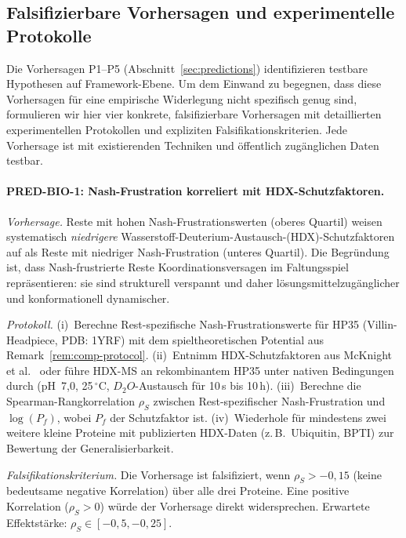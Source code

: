 \documentclass[12pt,a4paper]{article}
\theoremstyle{remark}
\begin{document}
\subsection{Falsifizierbare Vorhersagen und experimentelle Protokolle}
\label{sec:falsifiable-predictions}

Die Vorhersagen P1--P5 (Abschnitt~\ref{sec:predictions}) identifizieren testbare Hypothesen auf Framework-Ebene. Um dem Einwand zu begegnen, dass diese Vorhersagen f\"ur eine empirische Widerlegung nicht spezifisch genug sind, formulieren wir hier vier konkrete, falsifizierbare Vorhersagen mit detaillierten experimentellen Protokollen und expliziten Falsifikationskriterien. Jede Vorhersage ist mit existierenden Techniken und \"offentlich zug\"anglichen Daten testbar.

\paragraph{PRED-BIO-1: Nash-Frustration korreliert mit HDX-Schutzfaktoren.}

\textit{Vorhersage.}
Reste mit hohen Nash-Frustrationswerten (oberes Quartil) weisen systematisch \emph{niedrigere} Wasserstoff-Deuterium-Austausch-(HDX)-Schutzfaktoren auf als Reste mit niedriger Nash-Frustration (unteres Quartil). Die Begr\"undung ist, dass Nash-frustrierte Reste Koordinationsversagen im Faltungsspiel repr\"asentieren: sie sind strukturell verspannt und daher l\"osungsmittelzug\"anglicher und konformationell dynamischer.

\textit{Protokoll.}
(i)~Berechne Rest-spezifische Nash-Frustrationswerte f\"ur HP35 (Villin-Headpiece, PDB: 1YRF) mit dem spieltheoretischen Potential aus Remark~\ref{rem:comp-protocol}.
(ii)~Entnimm HDX-Schutzfaktoren aus McKnight et al.\ \cite{McKnight1996} oder f\"uhre HDX-MS an rekombinantem HP35 unter nativen Bedingungen durch (pH~7{,}0, 25$\,^\circ$C, $D_2O$-Austausch f\"ur 10\,s bis 10\,h).
(iii)~Berechne die Spearman-Rangkorrelation $\rho_S$ zwischen Rest-spezifischer Nash-Frustration und $\log(P_f)$, wobei $P_f$ der Schutzfaktor ist.
(iv)~Wiederhole f\"ur mindestens zwei weitere kleine Proteine mit publizierten HDX-Daten (z.\,B.\ Ubiquitin, BPTI) zur Bewertung der Generalisierbarkeit.

\textit{Falsifikationskriterium.}
Die Vorhersage ist falsifiziert, wenn $\rho_S > -0{,}15$ (keine bedeutsame negative Korrelation) \"uber alle drei Proteine. Eine positive Korrelation ($\rho_S > 0$) w\"urde der Vorhersage direkt widersprechen. Erwartete Effektst\"arke: $\rho_S \in [-0{,}5, -0{,}25]$.
\end{document}
